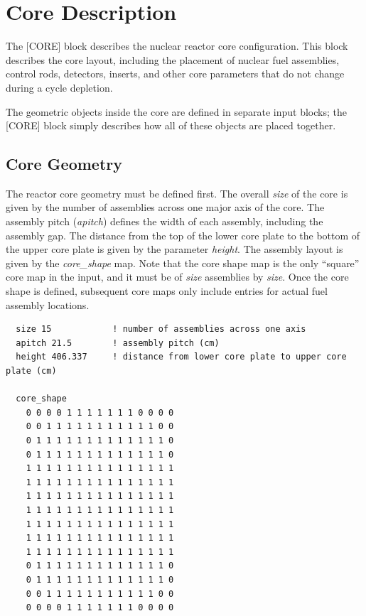%
%
\section{Core Description}

The [CORE] block describes the nuclear reactor core configuration.  This block describes the core layout, including
the placement of nuclear fuel assemblies, control rods, detectors, inserts, and other core parameters
that do not change during a cycle depletion.

The geometric objects inside the core are defined in separate input blocks; the [CORE] block
simply describes how all of these objects are placed together.

\subsection{Core Geometry}

The reactor core geometry must be defined first. The overall {\it size} of the core is
given by the number of assemblies across one major axis of the core.  The assembly pitch ({\it apitch}) defines the
width of each assembly, including the assembly gap. The distance from the top of the lower core plate to the
bottom of the upper core plate is given by the parameter {\it height}.
The assembly layout is given by the {\it core\_shape} map.
Note that the core shape map is the only ``square'' core map in the input, and it must be of {\it size} assemblies by {\it size}.
Once the core shape is defined, subsequent core maps only include entries for actual fuel assembly locations.

\begin{verbatim}
  size 15            ! number of assemblies across one axis
  apitch 21.5        ! assembly pitch (cm)
  height 406.337     ! distance from lower core plate to upper core plate (cm)

  core_shape
    0 0 0 0 1 1 1 1 1 1 1 0 0 0 0
    0 0 1 1 1 1 1 1 1 1 1 1 1 0 0
    0 1 1 1 1 1 1 1 1 1 1 1 1 1 0
    0 1 1 1 1 1 1 1 1 1 1 1 1 1 0
    1 1 1 1 1 1 1 1 1 1 1 1 1 1 1
    1 1 1 1 1 1 1 1 1 1 1 1 1 1 1
    1 1 1 1 1 1 1 1 1 1 1 1 1 1 1
    1 1 1 1 1 1 1 1 1 1 1 1 1 1 1
    1 1 1 1 1 1 1 1 1 1 1 1 1 1 1
    1 1 1 1 1 1 1 1 1 1 1 1 1 1 1
    1 1 1 1 1 1 1 1 1 1 1 1 1 1 1
    0 1 1 1 1 1 1 1 1 1 1 1 1 1 0
    0 1 1 1 1 1 1 1 1 1 1 1 1 1 0
    0 0 1 1 1 1 1 1 1 1 1 1 1 0 0
    0 0 0 0 1 1 1 1 1 1 1 0 0 0 0
\end{verbatim}

